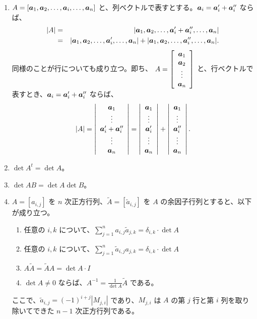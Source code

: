 \begin{enumerate}
\item $A = [\mbox{\boldmath $a$}_1, \mbox{\boldmath $a$}_2,\ldots, \mbox{\boldmath $a$}_i,\ldots, \mbox{\boldmath $a$}_n]$ と、列ベクトルで表すとする。$\mbox{\boldmath $a$}_i = \mbox{\boldmath $a$}_i' + \mbox{\boldmath $a$}_i''$ ならば、
\begin{eqnarray*}
|A| & = & |\mbox{\boldmath $a$}_1, \mbox{\boldmath $a$}_2,\ldots, \mbox{\boldmath $a$}_i' + \mbox{\boldmath $a$}_i'',\ldots, \mbox{\boldmath $a$}_n| \\
&= & |\mbox{\boldmath $a$}_1, \mbox{\boldmath $a$}_2,\ldots, \mbox{\boldmath $a$}_i',\ldots, \mbox{\boldmath $a$}_n| + |\mbox{\boldmath $a$}_1, \mbox{\boldmath $a$}_2,\ldots, \mbox{\boldmath $a$}_i'',\ldots, \mbox{\boldmath $a$}_n|.
\end{eqnarray*}
同様のことが行についても成り立つ。即ち、
${\displaystyle A =\left[\begin{array}{c}\mbox{\boldmath $a$}_{1}\\ \mbox{\boldmath $a$}_{2}\\ \vdots\\ \mbox{\boldmath $a$}_{n}\end{array}\right]}$ と、行ベクトルで表すとき、$\mbox{\boldmath $a$}_i = \mbox{\boldmath $a$}_i' + \mbox{\boldmath $a$}_i''$ ならば、
$$|A| = \left|\begin{array}{c}\mbox{\boldmath $a$}_{1}\\ \vdots\\ \mbox{\boldmath $a$}_i' + \mbox{\boldmath $a$}_i''\\ \vdots\\\mbox{\boldmath $a$}_{n}\end{array}\right| = \left|\begin{array}{c}\mbox{\boldmath $a$}_{1}\\ \vdots\\ \mbox{\boldmath $a$}_i' \\ \vdots\\\mbox{\boldmath $a$}_{n}\end{array}\right| + \left|\begin{array}{c}\mbox{\boldmath $a$}_{1}\\ \vdots\\  \mbox{\boldmath $a$}_i''\\ \vdots\\\mbox{\boldmath $a$}_{n}\end{array}\right|.$$

\item $\det A^t = \det A$。

\item $\det AB = \det A\det B$。

\item $A = [a_{i,j}]$ を $n$ 次正方行列、$\widetilde{A} = [\tilde{a}_{i,j}]$ を $A$ の余因子行列とすると、以下が成り立つ。
\begin{enumerate}
\item 任意の $i,k$ について、${\displaystyle \sum_{j = 1}^na_{i,j}\tilde{a}_{j,k} = \delta_{i,k}\cdot\det A}$
\item 任意の $i,k$ について、${\displaystyle \sum_{j = 1}^n\tilde{a}_{i,j} a_{j,k}= \delta_{i,k}\cdot\det A}$
\item $A\widetilde{A} = \widetilde{A}A = \det A\cdot I$
\item $\det A\neq 0$ ならば、${\displaystyle A^{-1} = \frac{1}{\det A}\widetilde{A}}$ である。
\end{enumerate}
ここで、$\tilde{a}_{i,j} = (-1)^{i+j}|M_{j,i}|$ であり、$M_{j,i}$ は $A$ の第 $j$ 行と第 $i$ 列を取り除いてできた $n-1$ 次正方行列である。
\end{enumerate}

